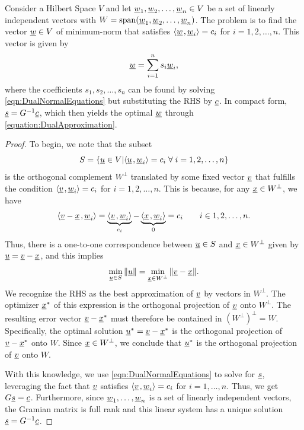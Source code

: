 \begin{theorem}
\label{thm:dual_approx}
Consider a Hilbert Space $V$ and let $\underline{w}_1 ,\underline{w}_2 , \ldots, \underline{w}_n \in V$ be a set of linearly independent vectors with $W = \mathrm{span} (\underline{w}_1 ,\underline{w}_2 , \ldots, \underline{w}_n)$.
The  problem is to find the vector $\underline{w}\in V$ of minimum-norm that satisfies ${\left\langle  \underline{w}  \mskip2mu ,  \underline{w}_i  \right\rangle} = c_i$ for $i=1, 2, \ldots, n$.
This vector is given by
\begin{equation} \label{equation:DualApproximation}
\underline{w} = \sum_{i=1}^n s_i \underline{w}_i,
\end{equation}
where the coefficients  $s_1, s_2, \ldots, s_n$ can be found by solving \eqref{eqn:DualNormalEquations} but substituting the RHS by $\underline{c}$.
In compact form, $\underline{s} = G^{-1} \underline{c}$, which then yields the optimal $\underline{w}$ through \eqref{equation:DualApproximation}.
\end{theorem}
\begin{proof}
To begin, we note that the subset
\[ S = \{ \underline{u} \in V | {\left\langle  \underline{u}  \mskip2mu ,  \underline{w}_i  \right\rangle} = c_i\; \forall\; i=1, 2, \ldots, n \} \]
is the orthogonal complement $W^{\bot}$ translated by some fixed vector $\underline{v}$ that fulfills the condition
${\left\langle  \underline{v}  \mskip2mu ,  \underline{w}_i  \right\rangle} = c_i$ for $i=1, 2, \ldots, n$.
This is because, for any $\underline{x} \in W^{\perp}$, we have
\begin{equation*}
{\left\langle  \underline{v} - \underline{x}  \mskip2mu ,  \underline{w}_i  \right\rangle}
= \underbrace{{\left\langle  \underline{v}  \mskip2mu ,  \underline{w}_i  \right\rangle}}_{c_i} - \underbrace{{\left\langle  \underline{x}  \mskip2mu ,  \underline{w}_i  \right\rangle}}_0
= c_i \qquad i \in 1, 2, \ldots, n .
\end{equation*}
Thus, there is a one-to-one correspondence between $\underline{u} \in S$ and $\underline{x}\in W^\perp$ given by $\underline{u} = \underline{v}-\underline{x}$, and this implies
\begin{equation*}
\min_{\underline{u}\in S} \| \underline{u} \|  = \min_{\underline{x}\in W^{\perp}} \| \underline{v} - \underline{x} \|.
\end{equation*}
We recognize the RHS as the best approximation of $\underline{v}$ by vectors in $W^{\bot}$.
The optimizer $\underline{x}^*$ of this expression is the orthogonal projection of $\underline{v}$ onto $W^\perp$.
The resulting error vector $\underline{v}-\underline{x}^*$ must therefore be contained in $(W^\perp)^\perp = W$.
Specifically, the optimal solution $\underline{u}^* = \underline{v} - \underline{x}^*$ is the orthogonal projection of $\underline{v} - \underline{x}^*$ onto $W$.
Since $\underline{x} \in W^{\bot}$, we conclude that $\underline{u}^*$ is the orthogonal projection of $\underline{v}$ onto $W$.

With this knowledge, we use \eqref{eqn:DualNormalEquations} to solve for $\underline{s}$, leveraging the fact that $\underline{v}$ satisfies ${\left\langle  \underline{v}  \mskip2mu ,  \underline{w}_i  \right\rangle} = c_i$ for $i = 1, \ldots, n$.
Thus, we get $G \underline{s} = \underline{c}$.
Furthermore, since $\underline{w}_1,\ldots,\underline{w}_n$ is a set of linearly independent vectors, the Gramian matrix is full rank and this linear system has a unique solution $\underline{s} = G^{-1} \underline{c}$.
\end{proof}

